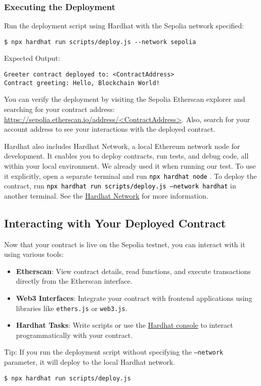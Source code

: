 \documentclass[12pt]{article}
\newcommand{\codegrey}[1]{%
  \texttt{\colorbox{black!4}{\textcolor{black}{#1}}}%
}
\begin{document}
\subsubsection{Executing the Deployment}

Run the deployment script using Hardhat with the Sepolia network specified:

\begin{verbatim}
$ npx hardhat run scripts/deploy.js --network sepolia
\end{verbatim}
Expected Output:
\begin{verbatim}
Greeter contract deployed to: <ContractAddress>
Contract greeting: Hello, Blockchain World!
\end{verbatim}
You can verify the deployment by visiting the Sepolia Etherscan explorer and
searching for your contract address:
\url{https://sepolia.etherscan.io/address/<ContractAddress>}. Also, search for
your account address to see your interactions with the deployed contract.

\noindent
Hardhat also includes Hardhat Network, a local Ethereum network node for development. It enables you to deploy contracts, run tests, and debug code, all within your local environment. We already used it when running our test. To use it explicitly, open a separate terminal and run \codegrey{npx hardhat node}. To deploy the contract, run \codegrey{npx hardhat run scripts/deploy.js --network hardhat} in another terminal. See the \href{https://hardhat.org/hardhat-network/docs/overview\#hardhat-network}{Hardhat Network} for more information.

\subsection{Interacting with Your Deployed Contract}

Now that your contract is live on the Sepolia testnet, you can interact with it
using various tools:

\begin{itemize}
    \item \textbf{Etherscan}: View contract details, read functions, and execute transactions directly from the Etherscan interface.

    \item \textbf{Web3 Interfaces}: Integrate your contract with frontend applications using libraries like \texttt{ethers.js} or \texttt{web3.js}.

    \item \textbf{Hardhat Tasks}: Write scripts or use the \href{https://hardhat.org/hardhat-runner/docs/guides/hardhat-console}{Hardhat console} to interact programmatically with your contract.
\end{itemize}
Tip: If you run the deployment script without specifying the \texttt{--network} parameter, it will deploy to the local Hardhat network.
\begin{verbatim}
$ npx hardhat run scripts/deploy.js
\end{verbatim}
\end{document}
